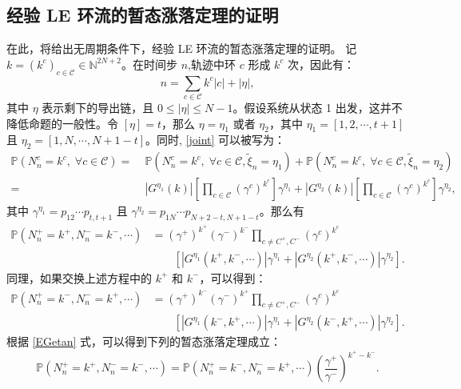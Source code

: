 \begin{appendices}
\section{经验 LE 环流的暂态涨落定理的证明}
在此，将给出无周期条件下，经验 LE 环流的暂态涨落定理的证明。
记 $k=(k^c)_{c\in\mathcal{C}}\in \mathbb{N}^{2N+2}$。在时间步 $n$,轨迹中环 $c$ 形成 $k^c$ 次，因此有：
\begin{equation*}
	n=\sum_{c\in\mathcal{C}}k^c|c|+|\eta|,
\end{equation*}
其中 $\eta$ 表示剩下的导出链，且 $0\le |\eta|\le N-1$。假设系统从状态 1 出发，这并不降低命题的一般性。令 $[\eta]=t$，那么 $\eta=\eta_1$ 或者 $\eta_2$，其中 $\eta_1=[1,2,\cdots,t+1]$ 且 $\eta_2=[1,N,\cdots,N+1-t]$。同时, \eqref{joint} 可以被写为：
\begin{equation}\label{joint2}
	\begin{split}
		\mathbb{P}\left(N^c_n=k^c,\;\forall c\in\mathcal{C}\right)
		=&\;\mathbb{P}\left(N^c_n=k^c,\;\forall c\in\mathcal{C},\tilde{\xi}_n=\eta_1\right)+\mathbb{P}\left(N^c_n=k^c,\;\forall c\in\mathcal{C},\tilde{\xi}_n=\eta_2\right)\\
		=&\;\left|G^{\eta_1}(k)\right|\left[\prod_{c\in\mathcal{C}}\left(\gamma^c\right)^{k^c}\right]\gamma^{\eta_1}+\left|G^{\eta_2}(k)\right|\left[\prod_{c\in\mathcal{C}}\left(\gamma^c\right)^{k^c}\right]\gamma^{\eta_2},
	\end{split}
\end{equation}
其中 $\gamma^{\eta_1}=p_{12}\cdots p_{t,t+1}$ 且 $\gamma^{\eta_2}=p_{1N}\cdots p_{N+2-t,N+1-t}$。那么有
\begin{align*}
	\mathbb{P}\left(N^+_n=k^+,N^-_n=k^-,\cdots\right)
	&= (\gamma^+)^{k^+}(\gamma^-)^{k^-}\prod_{c\neq C^+,C^-}\left(\gamma^c\right)^{k^c}\\
	&\qquad\left[|G^{\eta_1}(k^+,k^-,\cdots)|\gamma^{\eta_1}+|G^{\eta_2}(k^+,k^-,\cdots)|\gamma^{\eta_2}\right].
\end{align*}
同理，如果交换上述方程中的 $k^+$ 和 $k^-$，可以得到：
\begin{align*}
	\mathbb{P}\left(N^+_n=k^-,N^-_n=k^+,\cdots\right)
	&= (\gamma^+)^{k^-}(\gamma^-)^{k^+}\prod_{c\neq C^+,C^-}\left(\gamma^c\right)^{k^c}\\
	&\qquad\left[|G^{\eta_1}(k^-,k^+,\cdots)|\gamma^{\eta_1}+|G^{\eta_2}(k^-,k^+,\cdots)|\gamma^{\eta_2}\right].
\end{align*}
根据 \eqref{EGetan} 式，可以得到下列的暂态涨落定理成立：
\begin{equation*}
	\mathbb{P}\left(N^+_n=k^+,N^-_n=k^-,\cdots\right)=\mathbb{P}\left(N^+_n=k^-,N^-_n=k^+,\cdots\right)\left(\frac{\gamma^+}{\gamma^-}\right)^{k^+-k^-}.
\end{equation*}

\end{appendices}
